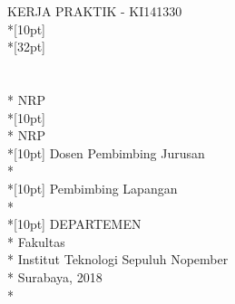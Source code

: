 \newpage

	\sffamily
	\thispagestyle{empty}
	{ \noindent KERJA PRAKTIK - KI141330 }\\*[10pt] 
	{\large\textbf{\MakeUppercase{\judul}}} \\*[32pt]
	\\
	\\
	\MakeUppercase{\penulis} \\*
	NRP \nrp \\*[10pt]
	\MakeUppercase{\penulisDua} \\*
	NRP \nrpDua \\*[10pt]
	Dosen Pembimbing Jurusan \\*
	\pembimbingJurusan \\*[10pt]
	Pembimbing Lapangan \\*
	\pembimbingLapangan \\*[10pt]
	DEPARTEMEN \MakeUppercase{\jurusan} \\*
	Fakultas \fakultas \\*
	Institut Teknologi Sepuluh Nopember \\*
	Surabaya, 2018 \\*
	\rmfamily
	\normalsize
	\restoregeometry
	\color{black}
	\cleardoublepage
